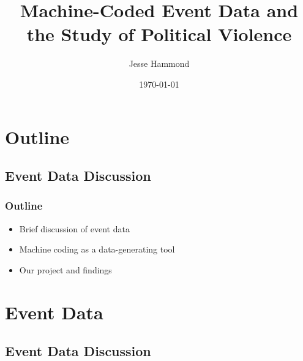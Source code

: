 \documentclass{beamer}
\title[GDELT Analysis]{Machine-Coded Event Data and the Study of Political Violence} %
\author{Jesse Hammond} %
\institute[UC-Davis, Uni-Konstanz] %
{
University of California, Davis \\ %
University of Konstanz\\
\medskip
\textit{jrhammond@ucdavis.edu} %
}
\date{\today} %
\begin{document}
\begin{frame}
\titlepage %
\end{frame}



\section{Outline} 
\subsection{Event Data Discussion} %
\begin{frame}
\frametitle{Outline}
\begin{itemize}
\item Brief discussion of event data
\vspace {5 mm}
\item Machine coding as a data-generating tool
\vspace {5 mm}
\item Our project and findings

\end{itemize}
\end{frame}
\section{Event Data} 
\subsection{Event Data Discussion} %
\end{document}
